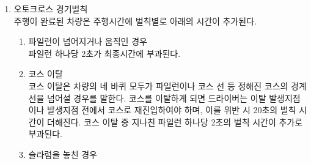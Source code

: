 \documentclass[final,a4paper,10pt]{report}
\begin{document}
\begin{enumerate}
    \begin{enumerate}
      \item\label{rule:formula-competition.autocross.run-procedure.timing-start-and-finish} 차량이 계측선상을 통과하는 순간 또는 신호등에 녹색등이 점등되는 순간 계측을 시작하고 주행을 완료하여 정차구간의 계측선상을 통과할 때까지의 기록을 측정하며, 계측 시작 방식은 조직위원회에서 경기장 상황에 따라 결정한다.
      \item\label{rule:formula-competition.autocross.run-procedure.two-groups-one-driver} 경기는 두 개의 그룹으로 나누어 진행하며, 각 그룹에는 한 명의 드라이버만 참여가 가능하다.
      \item\label{rule:formula-competition.autocross.run-procedure.two-attempts-four-runs} 드라이버 1인당 2번의 기회가 주어지며, 총 4회의 주행이 가능하다.
      \item\label{rule:formula-competition.autocross.run-procedure.new-driver-priority} 각 그룹에서 주행 우선권은 경기장 입장순으로 하되, 그룹 경기를 처음 참여하는 드라이버에게 우선권을 부여한다.
      \item\label{rule:formula-competition.autocross.run-procedure.time-limit-and-dnf} 조직위원회는 날씨 또는 기술적인 지연 등으로 인한 경기 진행에 대해 조정할 수 있으며, 경기 진행에 대한 제한 시간을 결정할 수 있다. 만약 제한된 시간 안에 주행을 마치지 못한 차량은 DNF 처리한다.
    \end{enumerate}
  \item\label{rule:formula-competition.autocross.penalties} 오토크로스 경기벌칙\\
    주행이 완료된 차량은 주행시간에 벌칙별로 아래의 시간이 추가된다.
    \begin{enumerate}
      \item\label{rule:formula-competition.autocross.penalties.cone-penalty-2s} 파일런이 넘어지거나 움직인 경우\\
        파일런 하나당 2초가 최종시간에 부과된다.
      \item\label{rule:formula-competition.autocross.penalties.course-exit-reentry-penalty} 코스 이탈\\
        코스 이탈은 차량의 네 바퀴 모두가 파일런이나 코스 선 등 정해진 코스의 경계선을 넘어설 경우를 말한다. 코스를 이탈하게 되면 드라이버는 이탈 발생지점이나 발생지점 전에서 코스로 재진입하여야 하며, 이를 위반 시 20초의 벌칙 시간이 더해진다. 코스 이탈 중 지나친 파일런 하나당 2초의 벌칙 시간이 추가로 부과된다.
      \item\label{rule:formula-competition.autocross.penalties.missed-slalom-gate-penalty} 슬라럼을 놓친 경우\\

\end{enumerate}
\end{enumerate}
\end{document}
